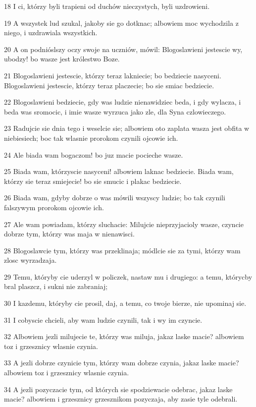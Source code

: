 \par 18 I ci, którzy byli trapieni od duchów nieczystych, byli uzdrowieni.
\par 19 A wszystek lud szukal, jakoby sie go dotknac; albowiem moc wychodzila z niego, i uzdrawiala wszystkich.
\par 20 A on podnióslszy oczy swoje na uczniów, mówil: Blogoslawieni jestescie wy, ubodzy! bo wasze jest królestwo Boze.
\par 21 Blogoslawieni jestescie, którzy teraz lakniecie; bo bedziecie nasyceni. Blogoslawieni jestescie, którzy teraz placzecie; bo sie smiac bedziecie.
\par 22 Blogoslawieni bedziecie, gdy was ludzie nienawidziec beda, i gdy wylacza, i beda was sromocic, i imie wasze wyrzuca jako zle, dla Syna czlowieczego.
\par 23 Radujcie sie dnia tego i weselcie sie; albowiem oto zaplata wasza jest obfita w niebiesiech; boc tak wlasnie prorokom czynili ojcowie ich.
\par 24 Ale biada wam bogaczom! bo juz macie pocieche wasze.
\par 25 Biada wam, którzyscie nasyceni! albowiem laknac bedziecie. Biada wam, którzy sie teraz smiejecie! bo sie smucic i plakac bedziecie.
\par 26 Biada wam, gdyby dobrze o was mówili wszyscy ludzie; bo tak czynili falszywym prorokom ojcowie ich.
\par 27 Ale wam powiadam, którzy sluchacie: Milujcie nieprzyjacioly wasze, czyncie dobrze tym, którzy was maja w nienawisci.
\par 28 Blogoslawcie tym, którzy was przeklinaja; módlcie sie za tymi, którzy wam zlosc wyrzadzaja.
\par 29 Temu, któryby cie uderzyl w policzek, nastaw mu i drugiego: a temu, którycby bral plaszcz, i sukni nie zabraniaj;
\par 30 I kazdemu, któryby cie prosil, daj, a temu, co twoje bierze, nie upominaj sie.
\par 31 I cobyscie chcieli, aby wam ludzie czynili, tak i wy im czyncie.
\par 32 Albowiem jezli milujecie te, którzy was miluja, jakaz laske macie? albowiem toz i grzesznicy wlasnie czynia.
\par 33 A jezli dobrze czynicie tym, którzy wam dobrze czynia, jakaz laske macie? albowiem toz i grzesznicy wlasnie czynia.
\par 34 A jezli pozyczacie tym, od których sie spodziewacie odebrac, jakaz laske macie? albowiem i grzesznicy grzesznikom pozyczaja, aby zasie tyle odebrali.
